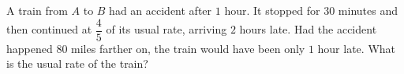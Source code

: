 A train from $A$ to $B$ had an accident after $1$ hour. It stopped for $30$ minutes and then continued at $\dfrac45$ of its usual rate, arriving $2$ hours late. Had the accident happened $80$ miles farther on, the train would have been only $1$ hour late. What is the usual rate of the train?

